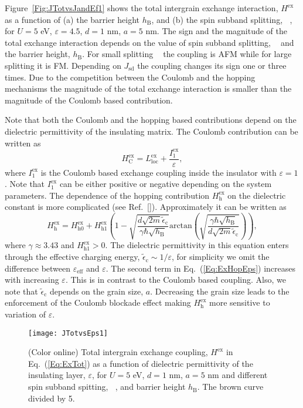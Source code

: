\documentclass[aps,prb,amsmath,amssymb,twocolumn,superscriptaddress,showpacs,floatfix]{revtex4-1}
\DeclareMathOperator{\Ji}{\mathit J_{\mathrm{sd}}}
\begin{document}
Figure~\ref{Fig:JTotvsJandEf1} shows the total intergrain exchange
interaction, $H^\mathrm{ex}$ as a function of (a) the barrier height $h_\mathrm B$,
and (b) the spin subband splitting, $\Ji$, for $U=5$ eV, $\varepsilon=4.5$, $d=1$ nm, $a=5$ nm.
The sign and the magnitude of the total exchange interaction depends on the value of
spin subband splitting, $\Ji$ and the barrier height, $h_\mathrm B$.
For small splitting $\Ji$ the coupling is AFM while for large
splitting it is FM. Depending on $J_\mathrm{sd}$ the coupling changes
its sign one or three times. Due to the competition between the Coulomb and
the hopping mechanisms the magnitude of the total exchange interaction
is smaller than the magnitude of the Coulomb based contribution.

Note that both the Coulomb and the hopping based
contributions depend on the dielectric permittivity of the
insulating matrix. The Coulomb contribution can be written as
\begin{equation}\label{Eq:ExCoulEps}
H^\mathrm{ex}_\mathrm C=L^\mathrm{ex}_{\mathrm{loc}}+\frac{I^\mathrm{ex}_1}{\varepsilon},
\end{equation}
where $I^\mathrm{ex}_1$ is the Coulomb based exchange coupling
inside the insulator with $\varepsilon=1$.
Note that $I^\mathrm{ex}_1$ can be either positive or negative depending on the system parameters.
The dependence of the hopping
contribution $H^\mathrm{ex}_\mathrm{h}$ on the dielectric constant
is more complicated (see Ref.~[]). Approximately it can be written as
\begin{equation}\label{Eq:ExHopEps}
H^\mathrm{ex}_\mathrm h=H^\mathrm{ex}_{\mathrm{h}0}+H^\mathrm{ex}_{\mathrm h 1}\left(\!\!1-\sqrt{\frac{ d \sqrt{2m}\tilde\epsilon_{\mathrm c}}{\gamma\hbar\sqrt{h_\mathrm B}}}\mathrm{arctan}\left(\sqrt{\frac{\gamma\hbar\sqrt{h_\mathrm B}}{ d \sqrt{2m}\tilde\epsilon_{\mathrm c}}}\right)\!\!\right),
\end{equation}
where $\gamma\approx3.43$ and $H^\mathrm{ex}_{\mathrm h 1}>0$. The
dielectric permittivity in this equation enters through the effective
charging energy, $\tilde\epsilon_\mathrm c\sim 1/\varepsilon$,
for simplicity we omit the difference between $\varepsilon_\mathrm{eff}$
and $\varepsilon$. The second term in Eq.~(\ref{Eq:ExHopEps}) increases
with increasing $\varepsilon$. This is in contrast to the Coulomb based
coupling. Also, we note that $\tilde\epsilon_\mathrm c$ depends on the grain size, $a$.
Decreasing the grain size leads to the enforcement of the Coulomb blockade
effect making $H^\mathrm{ex}_\mathrm h$ more sensitive to variation of $\varepsilon$.
\begin{figure}
\texttt{[image: JTotvsEps1]}
\caption{(Color online) Total intergrain exchange coupling, $H^\mathrm{ex}$ in Eq.~(\ref{Eq:ExTot}) as a function of dielectric
permittivity of the insulating layer, $\varepsilon$, for $U=5$ eV, $d=1$ nm, $a=5$ nm and
different spin subband spitting, $\Ji$, and barrier height $h_\mathrm B$. The brown curve divided by 5.} \label{Fig:JTotvsEps1}
\end{figure}
\end{document}
